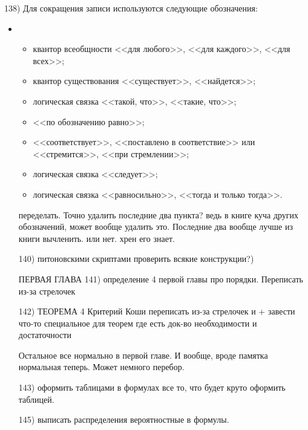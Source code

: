 138) Для сокращения записи используются следующие обозначения:
\begin{itemize}
\item[]
\begin{itemize}[noitemsep, label = ---]
\item \makebox[0pt][r]{$\forall$\hspace{0.75cm}}
квантор всеобщности <<для любого>>, <<для каждого>>, <<для всех>>;
\item \makebox[0pt][r]{$\exists$\hspace{0.75cm}}
квантор существования  <<существует>>, <<найдется>>;
\item \makebox[0pt][r]{$:$\hspace{0.75cm}}
логическая связка <<такой, что>>, <<такие, что>>;
\item \makebox[0pt][r]{$\triangleq$\hspace{0.75cm}} 
<<по обозначению равно>>;
\item \makebox[0pt][r]{$\to$\hspace{0.75cm}}
<<соответствует>>, <<поставлено в соответствие>> или <<стремится>>, <<при стремлении>>;
\item \makebox[0pt][r]{$\Rightarrow$\hspace{0.75cm}}
логическая связка <<следует>>;
\item \makebox[0pt][r]{$\Longleftrightarrow$\hspace{0.75cm}}
логическая связка <<равносильно>>, <<тогда и только тогда>>.
\end{itemize}

переделать. Точно удалить последние два пункта? ведь в книге куча других обозначений, может вообще удалить это. Последние два вообще лучше из книги вычленить. или нет. хрен его знает.

140) питоновскими скриптами проверить всякие конструкции?)

ПЕРВАЯ ГЛАВА
141) определение 4 первой главы про порядки. Переписать из-за стрелочек

142) ТЕОРЕМА 4 Критерий Коши переписать из-за стрелочек и + завести что-то специальное для теорем где есть док-во необходимости и достаточности

Остальное все нормально в первой главе. И вообще, вроде памятка нормальная теперь. Может немного перебор.

143) оформить таблицами в формулах все то, что будет круто оформить таблицей.

145) выписать распределения вероятностные в формулы.


\end{itemize}
